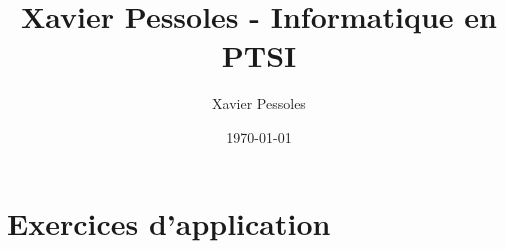 \documentclass[
	fontsize=10pt, %
	twoside=true, %
]{kaobook}
\newcommand{\repRel}{../../../..}
\newcommand{\repStyle}{\repRel/Style}
\begin{document}

\titlehead{Xavier Pessoles - Informatique en PTSI }
\title[Xavier Pessoles - Informatique en PTSI]{Xavier Pessoles - Informatique en PTSI}
\author[XP]{Xavier Pessoles}
\date{\today}


\begingroup %
\endgroup

%
\mainmatter %
%
%
%
%


\setcounter{margintocdepth}{\sectiontocdepth}
\marginlayout
\graphicspath{{\repStyle/png}}

\pagestyle{xp.scrheadings}



%



\newcommand{\repExo}{Application_01_ROV}
\newcommand{\nomExo}{Application_01_ROV}

\livrettrue %
\collefalse

\setcounter{chapter}{10}
\proftrue



\newpage
\section*{Exercices d'application}
\graphicspath{{\repStyle/png}{\repRel/Informatique/Exercices/S2_06_Graphes/}}


%


%
\newpage


\end{document}
